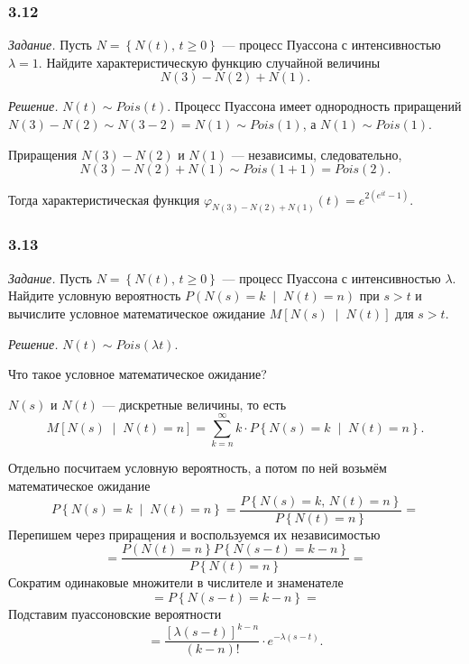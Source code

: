 \subsubsection*{3.12}

\textit{Задание.}
Пусть $N = \left\{ N \left( t \right), \, t \geq 0 \right\} $ ---
процесс Пуассона с интенсивностью $ \lambda = 1$.
Найдите характеристическую функцию случайной величины
$$N \left( 3 \right) - N \left( 2 \right) + N \left( 1 \right).$$

\textit{Решение.}
$N \left( t \right) \sim Pois \left( t \right) $.
Процесс Пуассона имеет однородность приращений
$N \left( 3 \right) - N \left( 2 \right) \sim
  N \left( 3 - 2 \right) =
  N \left( 1 \right)
  \sim Pois \left( 1 \right) $,
а $N \left( 1 \right) \sim Pois \left( 1 \right) $.

Приращения $N \left( 3 \right) - N \left( 2 \right) $ и $N \left( 1 \right) $ --- независимы,
следовательно,
$$N \left( 3 \right) - N \left( 2 \right) + N \left( 1 \right) \sim
  Pois \left( 1 + 1 \right) =
  Pois \left( 2 \right).$$

Тогда характеристическая функция
$ \varphi_{N \left( 3 \right) - N \left( 2 \right) + N \left( 1 \right) } \left( t \right) =
  e^{2 \left( e^{it} - 1 \right) }$.

\subsubsection*{3.13}

\textit{Задание.}
Пусть $N = \left\{ N \left( t \right), \, t \geq 0 \right\} $ ---
процесс Пуассона с интенсивностью $ \lambda $.
Найдите условную вероятность
$P \left( N \left( s \right) = k \; \middle| \; N \left( t \right) = n \right) $ при $s > t$
и вычислите условное математическое ожидание
$M \left[ N \left( s \right) \; \middle| \; N \left( t \right) \right] $ для $s >  t$.

\textit{Решение.}
$N \left( t \right) \sim Pois \left( \lambda t \right) $.

Что такое условное математическое ожидание?

$N \left( s \right) $ и $N \left( t \right) $ --- дискретные величины, то есть
$$M \left[ N \left( s \right) \; \middle| \; N \left( t \right) = n \right] =
  \sum \limits_{k = n}^{ \infty }
    k \cdot P \left\{ N \left( s \right) = k \; \middle| \; N \left( t \right) = n \right\}.$$

Отдельно посчитаем условную вероятность, а потом по ней возьмём математическое ожидание
$$P \left\{ N \left( s \right) = k \; \middle| \; N \left( t \right) = n \right\} =
  \frac{P \left\{ N \left( s \right) = k, \, N \left( t \right) = n \right\} }{P \left\{ N \left( t \right) = n \right\} } =$$
Перепишем через приращения и воспользуемся их независимостью
$$= \frac{P \left( N \left( t \right) = n \right\} P \left\{ N \left( s - t \right) = k - n \right\} }{P \left\{ N \left( t \right) = n \right\} } =$$
Сократим одинаковые множители в числителе и знаменателе
$$= P \left\{ N \left( s - t \right) = k - n \right\} =$$
Подставим пуассоновские вероятности
$$= \frac{ \left[ \lambda \left( s - t \right) \right]^{k - n}}{ \left( k - n \right)!} \cdot
  e^{-\lambda \left( s - t \right) }.$$

